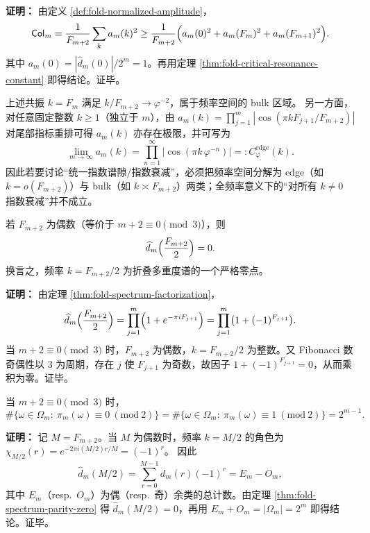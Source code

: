 \textbf{证明：}
由定义 \ref{def:fold-normalized-amplitude}，
\[
\mathsf{Col}_m=\frac{1}{F_{m+2}}\sum_{k}a_m(k)^2
\ge \frac{1}{F_{m+2}}\Bigl(a_m(0)^2+a_m(F_m)^2+a_m(F_{m+1})^2\Bigr).
\]
其中 \(a_m(0)=|\widehat d_m(0)|/2^m=1\)。再用定理 \ref{thm:fold-critical-resonance-constant} 即得结论。证毕。

\begin{remark}\label{rem:fold-edge-nondecay}
上述共振 \(k=F_m\) 满足 \(k/F_{m+2}\to \varphi^{-2}\)，属于频率空间的 bulk 区域。
另一方面，对任意固定整数 \(k\ge 1\)（独立于 \(m\)），由
\(
a_m(k)=\prod_{j=1}^m|\cos(\pi kF_{j+1}/F_{m+2})|
\)
对尾部指标重排可得 \(a_m(k)\) 亦存在极限，并可写为
\[
\lim_{m\to\infty}a_m(k)=\prod_{n=1}^{\infty}\bigl|\cos(\pi k\,\varphi^{-n})\bigr|=:C^{\mathrm{edge}}_\varphi(k).
\]
因此若要讨论“统一指数谱隙/指数衰减”，必须把频率空间分解为 edge（如 \(k=o(F_{m+2})\)）与 bulk（如 \(k\asymp F_{m+2}\)）两类；全频率意义下的“对所有 \(k\ne 0\) 指数衰减”并不成立。
\end{remark}

\begin{theorem}[奇偶性诱导的谱零点]
\label{thm:fold-spectrum-parity-zero}
若 $F_{m+2}$ 为偶数（等价于 $m+2\equiv 0\pmod 3$），则
\[
\widehat d_m\Bigl(\frac{F_{m+2}}{2}\Bigr)=0.
\]
换言之，频率 $k=F_{m+2}/2$ 为折叠多重度谱的一个严格零点。
\end{theorem}

\textbf{证明：}
由定理 \ref{thm:fold-spectrum-factorization}，
\[
\widehat d_m\Bigl(\frac{F_{m+2}}{2}\Bigr)=\prod_{j=1}^m\Bigl(1+e^{-\pi i F_{j+1}}\Bigr)
=\prod_{j=1}^m\bigl(1+(-1)^{F_{j+1}}\bigr).
\]
当 $m+2\equiv 0\pmod 3$ 时，$F_{m+2}$ 为偶数，$k=F_{m+2}/2$ 为整数。又 Fibonacci 数奇偶性以 3 为周期，存在 $j$ 使 $F_{j+1}$ 为奇数，故因子 $1+(-1)^{F_{j+1}}=0$，从而乘积为零。证毕。

\begin{corollary}[严格奇偶平衡律]\label{cor:fold-even-odd-balance}
当 $m+2\equiv 0\pmod 3$ 时，
\[
\#\{\omega\in\Omega_m:\ \pi_m(\omega)\equiv 0\ (\mathrm{mod}\ 2)\}
=
\#\{\omega\in\Omega_m:\ \pi_m(\omega)\equiv 1\ (\mathrm{mod}\ 2)\}
=2^{m-1}.
\]
\end{corollary}

\textbf{证明：}
记 $M=F_{m+2}$。当 $M$ 为偶数时，频率 $k=M/2$ 的角色为
\(
\chi_{M/2}(r)=e^{-2\pi i (M/2)r/M}=(-1)^r
\)。
因此
\[
\widehat d_m(M/2)=\sum_{r=0}^{M-1} d_m(r)(-1)^r
=E_m-O_m,
\]
其中 $E_m$（resp.\ $O_m$）为偶（resp.\ 奇）余类的总计数。由定理 \ref{thm:fold-spectrum-parity-zero} 得 $\widehat d_m(M/2)=0$，再用 $E_m+O_m=|\Omega_m|=2^m$ 即得结论。证毕。

